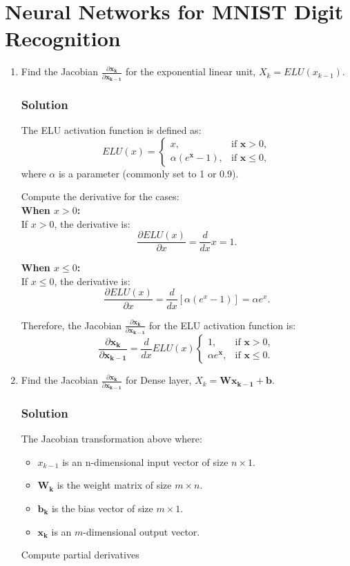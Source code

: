 \documentclass{article}
\begin{document}
\section{Neural Networks for MNIST Digit Recognition}
\begin{enumerate}[label=\alph*)]
   \item Find the Jacobian \( \frac{\partial \mathbf{x_k}}{\partial \mathbf{x_{k-1}}}\) for the exponential linear unit, \(X_k = ELU(x_{k-1})\).
      \subsubsection*{Solution}
      The ELU activation function is defined as:
      \[
      ELU(x) =
      \begin{cases}
      x, & \text{if } \mathbf{x} > 0, \\
      \alpha (e^{\mathbf{x}} - 1), & \text{if } \mathbf{x} \leq 0,
      \end{cases}
      \]
      where \(\alpha\) is a parameter (commonly set to 1 or 0.9).

      Compute the derivative for the cases:\\
      \textbf{When \(x > 0\):}\\
      If \(x > 0\), the derivative is:
      \[
      \frac{\partial ELU(x)}{\partial x} = \frac{d}{dx} x = 1.
      \]

      \textbf{When \(x \leq 0\):}\\
      If \(x \leq 0\), the derivative is:
      \[
      \frac{\partial ELU(x)}{\partial x} = \frac{d}{dx}[\alpha (e^x - 1)] = \alpha e^{x}.
      \]

      Therefore, the Jacobian \( \frac{\partial \mathbf{x_k}}{\partial \mathbf{x_{k-1}}} \) for the ELU activation function is:
      \[
      \frac{\partial \mathbf{x_k}}{\partial \mathbf{x_{k-1}}} = \frac{d}{dx} ELU (x)
      \begin{cases}
      1, & \text{if } \mathbf{x } > 0, \\
      \alpha e^{\mathbf{x}}, & \text{if } \mathbf{x} \leq 0.
      \end{cases}
      \]


   \item Find the Jacobian \( \frac{\partial \mathbf{x_k}}{\partial \mathbf{x_{k-1}}}\) for Dense layer, \(X_k = \mathbf{Wx_{k-1} + b}\).
      \subsubsection*{Solution}
      The Jacobian transformation above where:
      \begin{itemize}
         \item \(x_{k-1}\) is an n-dimensional input vector of size \(n \times 1\).
         \item \(\mathbf{W_k}\) is the weight matrix of size \(m \times n\).
         \item \(\mathbf{b_k}\) is the bias vector of size \(m \times 1\). 
         \item \(\mathbf{x_k}\) is an \(m\)-dimensional output vector.
      \end{itemize}
      Compute partial derivatives
     

\end{enumerate}
\end{document}
